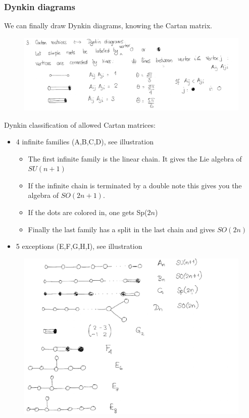 \documentclass[a4paper,12pt]{article}
\begin{document}
\subsubsection{Dynkin diagrams}
We can finally draw Dynkin diagrams, knowing the Cartan matrix.
\begin{figure}[H]
	\centering
	\includegraphics[width=1\linewidth]{28}
\end{figure} 
Dynkin classification of allowed Cartan matrices:
\begin{itemize}
	\item 4 infinite families (A,B,C,D), see illustration
	\begin{itemize}
		\item The first infinite family is the linear chain. It gives the Lie algebra of $SU(n+1)$
		\item If the infinite chain is terminated by a double note this gives you the algebra of $SO(2n+1)$.
		\item If the dots are colored in, one gets Sp($2n$)
		\item Finally the last family has a split in the last chain and gives $SO(2n)$
	\end{itemize}
	\item 5 exceptions (E,F,G,H,I), see illustration
\end{itemize}
\begin{figure}[H]
	\centering
	\includegraphics[width=0.8\linewidth]{29}
\end{figure} 
\end{document}
